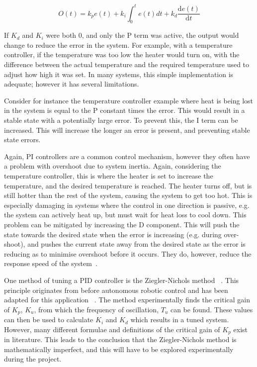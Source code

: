 \begin{equation}
\label{eqn:pid}
O(t) = k_{p}e(t) + k_i\int_{0}^{t}e(t)dt + k_d \frac{\mathrm{d} e(t) }{\mathrm{d} t}
\end{equation}

If $K_d$ and $K_i$ were both 0, and only the P term was active, the output 
would change to reduce the error in the system. For example, with a
temperature controller, if the temperature was too low the heater would
turn on, with the difference between the actual temperature and the required 
temperature used to adjust how high it was set. In many systems, this simple 
implementation is adequate; however it has several limitations. 

Consider for instance the temperature controller example where heat is being
lost in the system is equal to the P constant times the error. This would
result in a stable state with a potentially large error. To prevent this,
the I term can be increased. This will increase the longer an error is
present, and preventing stable state errors. 

Again, PI controllers are a common control mechanism, however they often have 
a problem with overshoot due to system inertia. Again, considering the 
temperature controller, this is where the heater is set to increase the 
temperature, and the desired temperature is reached. The heater turns off, but 
is still hotter than the rest of the system, causing the system to get too hot. 
This is especially damaging in systems where the control in one direction 
is passive, e.g. the system can actively heat up, but must wait for heat loss 
to cool down. This problem can be mitigated by increasing the D component. 
This will push the state towards the desired state when the error is increasing 
(e.g. during over-shoot), and pushes the current state away from the desired 
state as the error is reducing as to minimise overshoot before it 
occurs. They do, however, reduce the response speed of the system~\cite{chen2007linear}.

One method of tuning a PID controller is the Ziegler-Nichols method~
\cite{ziegler1942optimum}. This principle originates from before autonomous 
robotic control and has been adapted for this application~
\cite{aastrom2004revisiting}. The method experimentally finds the critical gain 
of $K_p$, $K_u$, from which the frequency of oscillation, $T_u$ can be found. 
These values can then be used to calculate $K_i$ and $K_d$ which results in a 
tuned system. However, many different formulae and definitions of the critical 
gain of $K_p$ exist in literature. This leads to the conclusion that the 
Ziegler-Nichols method is mathematically imperfect, and this will have to be 
explored experimentally during the project.

